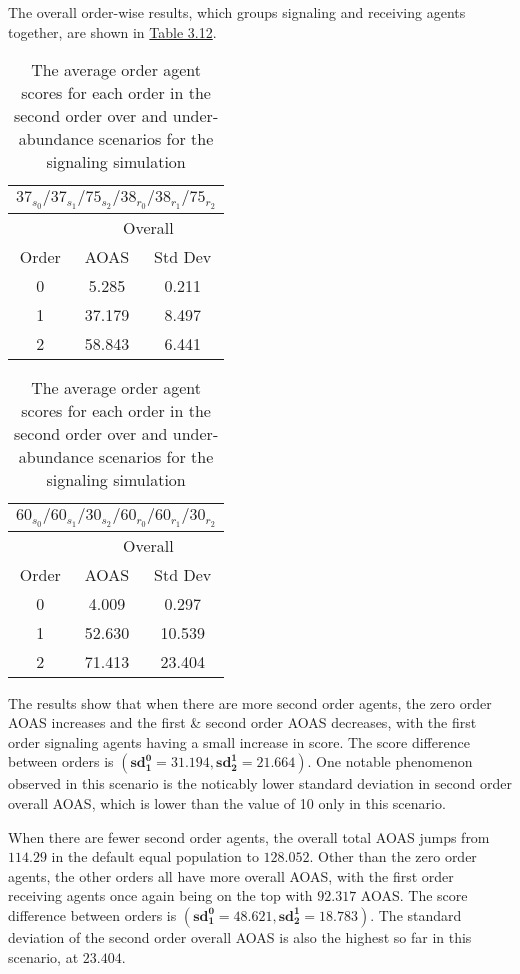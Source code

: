 The overall order-wise results, which groups signaling and receiving agents together, are shown in \hyperref[table:sig-second-order-overall]{Table 3.12}.

\begin{table}[h]
    \centering
    \begin{tabular}{|c|c|c|}
    \hline
    \multicolumn{3}{|c|}{$37_{s_{0}}/37_{s_{1}}/75_{s_{2}}/38_{r_{0}}/38_{r_{1}}/75_{r_{2}}$} \\
    \hline
    \multicolumn{1}{|c|}{} & \multicolumn{2}{|c|}{Overall} \\
    \hline
    Order & AOAS & Std Dev \\
    \hline
    0     & 5.285   & 0.211    \\
    1     & 37.179  & 8.497   \\
    2     & 58.843  & 6.441   \\
    \hline
    \end{tabular}
    \qquad
    \begin{tabular}{|c|c|c|}
    \hline
    \multicolumn{3}{|c|}{$60_{s_{0}}/60_{s_{1}}/30_{s_{2}}/60_{r_{0}}/60_{r_{1}}/30_{r_{2}}$} \\
    \hline
    \multicolumn{1}{|c|}{} & \multicolumn{2}{|c|}{Overall} \\
    \hline
    Order & AOAS & Std Dev \\
    \hline
    0     & 4.009   & 0.297    \\
    1     & 52.630  & 10.539   \\
    2     & 71.413  & 23.404   \\
    \hline
    \end{tabular}
    \caption{The average order agent scores for each order in the second order over and under-abundance scenarios for the signaling simulation}
    \label{table:sig-second-order-overall}
\end{table}

The results show that when there are more second order agents, the zero order AOAS increases and the first & second order AOAS decreases, with the first order signaling agents having a small increase in score. The score difference between orders is $(\mathbf{sd^0_1 = 31.194}, \mathbf{sd^1_2 = 21.664})$. One notable phenomenon observed in this scenario is the noticably lower standard deviation in second order overall AOAS, which is lower than the value of 10 only in this scenario.

When there are fewer second order agents, the overall total AOAS jumps from $\mathbf{114.29}$ in the default equal population to $\mathbf{128.052}$. Other than the zero order agents, the other orders all have more overall AOAS, with the first order receiving agents once again being on the top with $\mathbf{92.317}$ AOAS. The score difference between orders is $(\mathbf{sd^0_1 = 48.621}, \mathbf{sd^1_2 = 18.783})$. The standard deviation of the second order overall AOAS is also the highest so far in this scenario, at $\mathbf{23.404}$.

